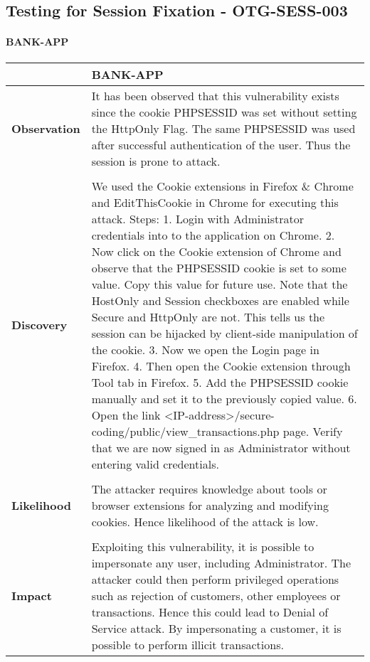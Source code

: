 \subsection{Testing for Session Fixation - OTG-SESS-003} \label{OTG-SESS-003}
\paragraph{BANK-APP} \mbox{}
\begin{longtable*}{p{.20\textwidth} | p{.80\textwidth}}
    \hline
    & \textbf{BANK-APP} \\
    \hline
    \textbf{Observation} &
      It has been observed that this vulnerability exists since the cookie PHPSESSID was set without setting the HttpOnly Flag. The same PHPSESSID was used after successful authentication of the user. Thus the session is prone to attack.
    \\\\
    \textbf{Discovery} &
        We used the Cookie extensions in Firefox \& Chrome and EditThisCookie in Chrome for executing this attack.
        Steps:
        1. Login with Administrator credentials into to the application on Chrome. 2. Now click on the Cookie extension of Chrome and observe that the PHPSESSID cookie  is set to some value. Copy this value for future use. Note that the HostOnly and Session checkboxes are enabled while Secure and HttpOnly are not. This tells us the session can be hijacked by client-side manipulation of the cookie. 3. Now we open the Login page in Firefox. 4. Then open the Cookie extension through Tool tab in Firefox. 5. Add the PHPSESSID cookie manually and set it to the previously copied value. 6. Open the link <IP-address>/secure-coding/public/view\_transactions.php page.
        Verify that we are now signed in as Administrator without entering valid credentials.
    \\\\
    \textbf{Likelihood} &
        The attacker requires knowledge about tools or browser extensions for analyzing and modifying cookies. Hence likelihood of the attack is low.
    \\\\
    \textbf{Impact} &
        Exploiting this vulnerability, it is possible to impersonate any user, including Administrator. The attacker could then perform privileged operations such as rejection of customers, other employees or transactions. Hence this could lead to Denial of Service attack. By impersonating a customer, it is possible to perform illicit transactions.

\end{longtable*}
